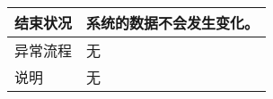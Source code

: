 \begin{table}[htbp]
\begin{tabular}{|l|l|l|l|}
        结束状况                          & \multicolumn{3}{l|}{系统的数据不会发生变化。  }                                                                                                                              \\
        \hline
        异常流程                          & \multicolumn{3}{l|}{   无}                                                                                                                                                   \\
        \hline
        说明                              & \multicolumn{3}{l|}{无    }                                                                                                                                                  \\
        \hline
    \end{tabular}
\end{table}

